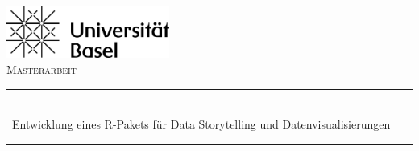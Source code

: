 


	\newcommand{\HRule}{\rule{\linewidth}{0.5mm}} %

	\begin{center}


	\includegraphics[width=0.4\textwidth]{images/uni-basel-logo.png}\\[2.5cm] %



	\textsc{\Large Masterarbeit}\\[0.5cm] %


	\HRule\\[0.4cm]

	{\huge\ Entwicklung eines R-Pakets für Data Storytelling und Datenvisualisierungen}\\[0.4cm] %

	\HRule\\[1.5cm]



\end{center}
